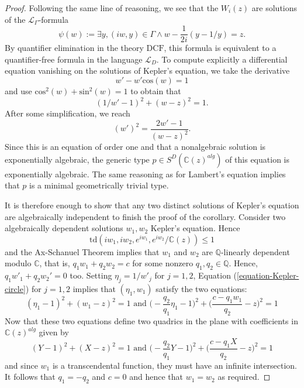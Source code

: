 \documentclass[12pt]{amsart}
\theoremstyle{definition}
\theoremstyle{plain}
\theoremstyle{exampstyle}\newtheorem{thmx}{Theorem}
\theoremstyle{exampstyle}\newtheorem{thmxbis}{Theorem}
\begin{document}
\begin{proof} 
Following the same line of reasoning, we see that the $W_i(z)$ are solutions of the $\mathcal L_\Gamma$-formula
$$\psi(w) := \exists y, (iw, y) \in \Gamma \wedge w - \frac{1}{2i}(y - 1/y) = z.$$
By quantifier elimination in the theory $\mathrm{DCF}$, this formula is equivalent to a quantifier-free formula in the language $\mathcal L_D$. To compute explicitly a differential equation vanishing on the solutions of Kepler's equation, we take the derivative
$$ w'  - w' \mathrm{cos}(w) = 1$$
and use $\mathrm{cos}^2(w)  + \mathrm{sin}^2(w) = 1$ to obtain that 
\begin{equation}\label{equation-Kepler-circle}
 (1/w' - 1)^2 + (w - z)^2 = 1.
 \end{equation}
After some simplification, we reach 
$$ (w')^2 = \frac{2w'- 1}{(w - z)^2}.$$ 
Since this is an equation of order one and that a nonalgebraic solution is exponentially algebraic,  the generic type $p \in S^D(\mathbb{C}(z)^{alg})$ of this equation is exponentially algebraic. The same reasoning as for Lambert's equation implies that $p$ is a minimal geometrically trivial type.

It is therefore enough to show that any two distinct solutions of Kepler's equation are algebraically independent to finish the proof of the corollary. Consider two algebraically dependent solutions $w_1,w_2$ Kepler's equation. Hence 
$$ \mathrm{td}(iw_1, iw_2, e^{iw_1}, e^{iw_2}/\mathbb{C}(z)) \leq 1 $$
and the Ax-Schanuel Theorem implies that $w_1$ and $w_2$ are $\mathbb{Q}$-linearly dependent modulo $\mathbb{C}$, that is, $q_1 w_1 + q_2 w_2 = c$
for some nonzero $q_1,q_2 \in \mathbb{Q}$. Hence, $q_1 w'_1 + q_2 w_2' = 0$ too. Setting $\eta_j = 1/w'_j$ for $j =1,2$, Equation (\ref{equation-Kepler-circle}) for $j  =1,2$ implies that $(\eta_1, w_1)$ satisfy the two equations:
$$ (\eta_1 - 1)^2 + (w_1 - z)^2 = 1 \text{ and }  \Big(- \frac {q_2} {q_1} \eta_1 - 1\Big)^2 + \Big(\frac{c - q_1w_1}{q_2} - z\Big)^2 = 1 $$ 
Now that these two equations define two quadrics in the plane with coefficients in $\mathbb{C}(z)^{alg}$ given by 
$$ (Y - 1)^2 + (X - z)^2 = 1 \text{ and }  \Big(- \frac {q_2} {q_1} Y - 1\Big)^2 + \Big(\frac{c - q_1 X}{q_2} - z\Big)^2 = 1 $$  
and since $w_1$ is a transcendental function, they must have an infinite intersection. It follows that $q_1 = - q_2$ and $c = 0$ and hence that $w_1 = w_2$ as required.
\end{proof}

%
%
\end{document}
